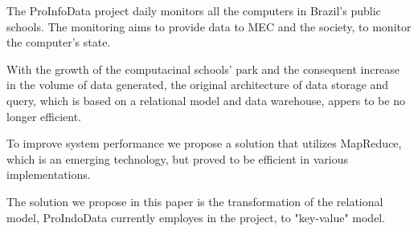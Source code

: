 

The ProInfoData project daily monitors all the computers in Brazil's public schools. The monitoring aims to
provide data to MEC and the society, to monitor the computer's state.

With the growth of the computacinal schools' park and the consequent increase in the volume of data generated,
the original architecture of data storage and query, which is based on a relational model and data warehouse,
appers to be no longer efficient.

To improve system performance we propose a solution that utilizes MapReduce, which is an emerging technology,
but proved to be efficient in various implementations.

The solution we propose in this paper is the transformation of the relational model,
ProIndoData currently employes in the project, to "key-value" model.